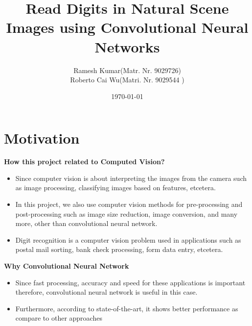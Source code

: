 \documentclass[12pt, letterpaper]{article}
\title{Read Digits in Natural Scene Images using Convolutional Neural Networks }
\author{Ramesh Kumar(Matr. Nr. 9029726) \\ Roberto Cai Wu(Matri. Nr. 9029544 )}
\date{\today}
\begin{document}
\begin{titlepage}
\maketitle
\end{titlepage}

\section{Motivation}
\textbf{How this project related to Computed Vision?}
	\begin{itemize}
		\item Since computer vision is about interpreting the images from the camera such as image processing, classifying images based on features, etcetera.
		\item In this project, we also use computer vision methods for pre-processing and post-processing such as image size reduction, image conversion, and many more,  other than convolutional neural network. 
				\item Digit recognition is a computer vision problem used in applications such as postal mail sorting, bank check processing, form data entry, etcetera. 
	\end{itemize}



\textbf{Why Convolutional Neural Network}
	\begin{itemize}
		\item Since fast processing, accuracy and speed for these applications is important therefore, convolutional neural network is useful in this case.
		\item Furthermore, according to state-of-the-art, it shows better performance as compare to other approaches\cite{Convolutional Neural Networks Applied to House Numbers Digit Classification}
	\end{itemize}

\end{document}
